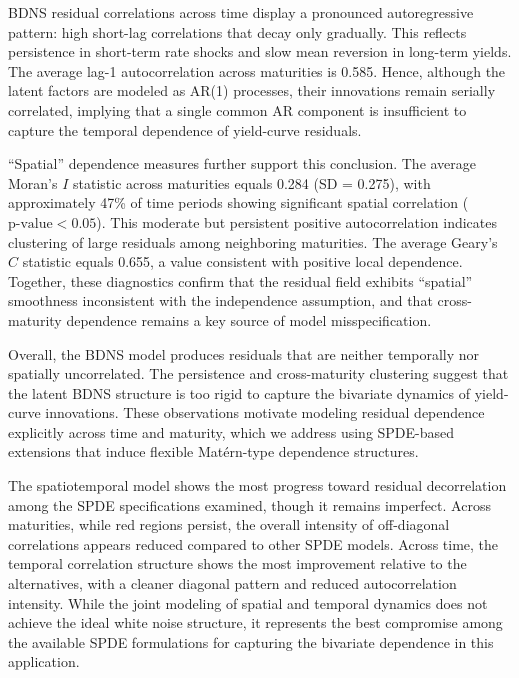 \documentclass[
  12pt]{article}
\begin{document}
BDNS residual correlations across time display a pronounced autoregressive pattern: high short-lag correlations that decay only gradually. This reflects persistence in short-term rate shocks and slow mean reversion in long-term yields. The average lag-1 autocorrelation across maturities is 0.585. Hence, although the latent factors are modeled as AR(1) processes, their innovations remain serially correlated, implying that a single common AR component is insufficient to capture the temporal dependence of yield-curve residuals.

``Spatial'' dependence measures further support this conclusion. The average Moran’s \( I \) statistic across maturities equals 0.284 (SD = 0.275), with approximately 47\% of time periods showing significant spatial correlation (\( \text{p-value} < 0.05 \)). This moderate but persistent positive autocorrelation indicates clustering of large residuals among neighboring maturities. The average Geary’s \( C \) statistic equals 0.655, a value consistent with positive local dependence. Together, these diagnostics confirm that the residual field exhibits ``spatial'' smoothness inconsistent with the independence assumption, and that cross-maturity dependence remains a key source of model misspecification.

Overall, the BDNS model produces residuals that are neither temporally nor spatially uncorrelated. The persistence and cross-maturity clustering suggest that the latent BDNS structure is too rigid to capture the bivariate dynamics of yield-curve innovations. These observations motivate modeling residual dependence explicitly across time and maturity, which we address using SPDE-based extensions that induce flexible Matérn-type dependence structures. 

The spatiotemporal model shows the most progress toward residual decorrelation among the SPDE specifications examined, though it remains imperfect. Across maturities, while red regions persist, the overall intensity of off-diagonal correlations appears reduced compared to other SPDE models. Across time, the temporal correlation structure shows the most improvement relative to the alternatives, with a cleaner diagonal pattern and reduced autocorrelation intensity. While the joint modeling of spatial and temporal dynamics does not achieve the ideal white noise structure, it represents the best compromise among the available SPDE formulations for capturing the bivariate dependence in this application.
\end{document}
